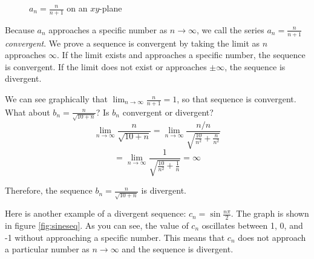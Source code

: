 \begin{figure}[htbp]
\centering
    \caption{$a_n =\frac{n}{n+1}$ on an $xy$-plane}
    \label{fig:planefrac}
\end{figure}

Because $a_n$ approaches a specific number as $n \to \infty$, we call the 
series $a_n = \frac{n}{n+1}$ \textit{convergent}. We prove a sequence is 
convergent by taking the limit as $n$ approaches $\infty$. If the limit exists 
and approaches a specific number, the sequence is convergent. If the limit 
does not exist or approaches $\pm\infty$, the sequence is divergent. 

We can see graphically that $\lim_{n \to \infty} \frac{n}{n+1} = 1$, so that 
sequence is convergent. What about $b_n = \frac{n}{\sqrt{10 + n}}$? Is $b_n$ 
convergent or divergent? 
$$\lim_{n \to \infty} \frac{n}{\sqrt{10 + n}} = 
\lim_{n \to \infty} \frac{n/n}{\sqrt{\frac{10}{n^2}+ \frac{n}{n^2}}}$$
$$=\lim_{n \to \infty} \frac{1}{\sqrt{\frac{10}{n^2}+\frac{1}{n}}} = \infty$$

Therefore, the sequence $b_n = \frac{n}{\sqrt{10 + n}}$ is divergent. 

Here is another example of a divergent sequence: $c_n = \sin{\frac{n\pi}{2}}$. 
The graph is shown in figure \ref{fig:sineseq}. As you can see, the value of 
$c_n$ oscillates between 1, 0, and -1 without approaching a specific number. 
This means that $c_n$ does not approach a particular number as $n \to \infty$ 
and the sequence is divergent. 

